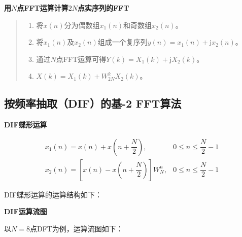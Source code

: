 \documentclass[cn, hazy, blue, normal, 14pt]{elegantnote}
\begin{document}
\textbf{用$N$点FFT运算计算$2N$点实序列的FFT}

\begin{quote}
\begin{enumerate}
    \item 将$x(n)$分为偶数组$x_1(n)$和奇数组$x_2(n)$。
    \item 将$x_1(n)$及$x_2(n)$组成一个复序列$y(n)=x_1(n)+\text{j}x_2(n)$。
    \item 通过$N$点FFT运算可得$Y(k)=X_1(k)+\text{j}X_2(k)$。
    \item $X(k)=X_1(k)+W_{2N}^{k}X_2(k)$。
\end{enumerate}
\end{quote}

\subsection{按频率抽取（DIF）的基-2 FFT算法}

\textbf{DIF蝶形运算}

\begin{equation}
\begin{array}{ll}
    x_1(n)=x(n)+x\left(n+\dfrac{N}{2}\right), & 0\leq n\leq \dfrac{N}{2}-1 \\
    x_2(n)=\left[x(n)-x\left(n+\dfrac{N}{2}\right)\right]W_N^n, & 0\leq n\leq \dfrac{N}{2}-1
\end{array}
\end{equation}

DIF蝶形运算的运算结构如下：

\begin{center}
\end{center}

\textbf{DIF运算流图}

以$N=8$点DFT为例，运算流图如下：
\end{document}
